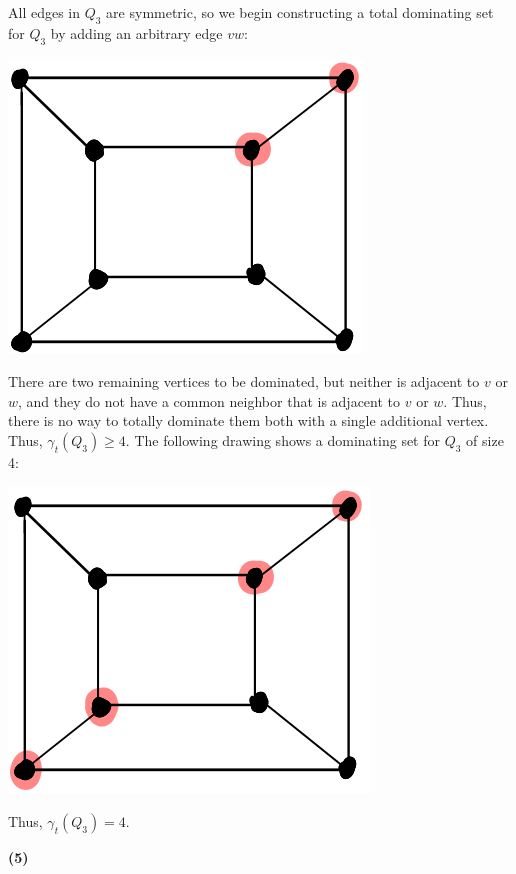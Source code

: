 \documentclass[12pt]{article}
\begin{document}
    All edges in $Q_3$ are symmetric, so we begin constructing a total dominating set for $Q_3$ by adding an arbitrary edge $vw$:
    \begin{center} \includegraphics[scale=.5]{6.png} \end{center}
    There are two remaining vertices to be dominated, but neither is adjacent to $v$ or $w$, and they do not have a common neighbor that is adjacent to $v$ or $w$.
    Thus, there is no way to totally dominate them both with a single additional vertex.
    Thus, $\gamma_t(Q_3) \geq 4$.
    The following drawing shows a dominating set for $Q_3$ of size 4:
    \begin{center}\includegraphics[scale=.5]{7.png}\end{center}
    Thus, $\gamma_t(Q_3) = 4$.
    
\newpage\noindent\textbf{(5)}
\end{document}
